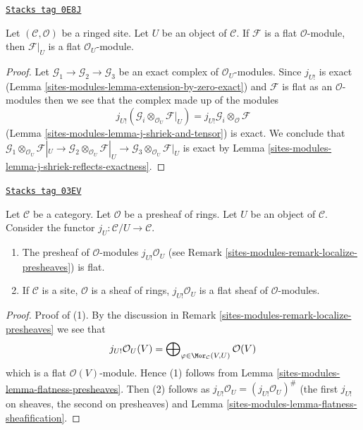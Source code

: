\begin{lemma}
\label{sites-modules-lemma-restriction-flat}
\href{https://stacks.math.columbia.edu/tag/0E8J}{\texttt{Stacks tag 0E8J}}

Let $(\mathcal{C}, \mathcal{O})$ be a ringed site.
Let $U$ be an object of $\mathcal{C}$.
If $\mathcal{F}$ is a flat $\mathcal{O}$-module, then
$\mathcal{F}|_U$ is a flat $\mathcal{O}_U$-module.
\end{lemma}

\begin{proof}
Let $\mathcal{G}_1 \to \mathcal{G}_2 \to \mathcal{G}_3$ be
an exact complex of $\mathcal{O}_U$-modules.
Since $j_{U!}$ is exact (Lemma \ref{sites-modules-lemma-extension-by-zero-exact})
and $\mathcal{F}$ is flat as an $\mathcal{O}$-modules
then we see that the complex made up of the modules
$$
j_{U!}(\mathcal{G}_i \otimes_{\mathcal{O}_U} \mathcal{F}|_U) =
j_{U!}\mathcal{G}_i \otimes_\mathcal{O} \mathcal{F}
$$
(Lemma \ref{sites-modules-lemma-j-shriek-and-tensor}) is exact. We conclude that
$\mathcal{G}_1 \otimes_{\mathcal{O}_U} \mathcal{F}|_U \to
\mathcal{G}_2 \otimes_{\mathcal{O}_U} \mathcal{F}|_U \to
\mathcal{G}_3 \otimes_{\mathcal{O}_U} \mathcal{F}|_U$
is exact by
Lemma \ref{sites-modules-lemma-j-shriek-reflects-exactness}.
\end{proof}

\begin{lemma}
\label{sites-modules-lemma-j-shriek-flat}
\href{https://stacks.math.columbia.edu/tag/03EV}{\texttt{Stacks tag 03EV}}

Let $\mathcal{C}$ be a category.
Let $\mathcal{O}$ be a presheaf of rings.
Let $U$ be an object of $\mathcal{C}$.
Consider the functor $j_U : \mathcal{C}/U \to \mathcal{C}$.
\begin{enumerate}
\item The presheaf of $\mathcal{O}$-modules
$j_{U!}\mathcal{O}_U$ (see
Remark \ref{sites-modules-remark-localize-presheaves})
is flat.
\item If $\mathcal{C}$ is a site, $\mathcal{O}$ is a sheaf of rings,
$j_{U!}\mathcal{O}_U$ is a flat sheaf of $\mathcal{O}$-modules.
\end{enumerate}
\end{lemma}

\begin{proof}
Proof of (1). By the discussion in
Remark \ref{sites-modules-remark-localize-presheaves}
we see that
$$
j_{U!}\mathcal{O}_U(V)
=
\bigoplus\nolimits_{\varphi \in \Mor_\mathcal{C}(V, U)}
\mathcal{O}(V)
$$
which is a flat $\mathcal{O}(V)$-module. Hence (1) follows from
Lemma \ref{sites-modules-lemma-flatness-presheaves}.
Then (2) follows as $j_{U!}\mathcal{O}_U = (j_{U!}\mathcal{O}_U)^\#$
(the first $j_{U!}$ on sheaves, the second on presheaves)
and Lemma \ref{sites-modules-lemma-flatness-sheafification}.
\end{proof}

